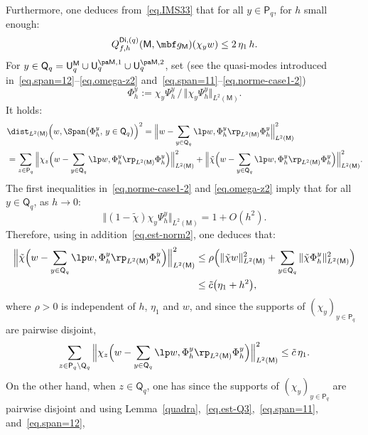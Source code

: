 Furthermore, one deduces from~\eqref{eq.IMS33} that for all $y\in \mathsf P_q$, for $h$ small enough:
\begin{equation}\label{eq.est-Q3}
Q_{f,h}^{\mathsf{Di},(q)}(\mathsf M,\mbf g_{\mathsf M})(\chi_y w) \le 2\, \eta_1\, h.
\end{equation}
For $y\in \mathsf Q_q= \mathsf U_q^{\mathsf M}\cup \mathsf U^{\pa
\mathsf M,1}_q\cup \mathsf U^{\pa \mathsf M,2}_q$, set (see the
quasi-modes introduced in~\eqref{eq.span=12}--\eqref{eq.omega-z2} and~\eqref{eq.span=11}--\eqref{eq.norme-case1-2})
\begin{equation}\label{eq.PHIY}
\Phi_h^y:= \chi_y\Psi_h^y\, /\, \Vert \chi_y \Psi_h^y \Vert_{L^2(\mathsf M)}.
\end{equation}
It holds:
\begin{align*}
&\dist_{L^2(\mathsf M)}\Bigl(w, \Span \bigl(\Phi_h^y, \, y\in \mathsf Q_q \bigr) \Bigr)^2= \Big \Vert w- \sum_{y \in \mathsf Q_q} \lp w, \Phi_h^y\rp _{L^2(\mathsf M)} \Phi_h^y \Big \Vert_{L^2(\mathsf M)}^2\\
&= \sum_{z\in \mathsf P_q}\Big \Vert \chi_z\Bigl(w- \sum_{y
\in \mathsf Q_q} \lp w, \Phi_h^y\rp _{L^2(\mathsf M)} \Phi_h^y\Bigr) \Big \Vert_{L^2(\mathsf M)}^2 +\Big\Vert \tilde \chi\Bigl(w- \sum_{y \in \mathsf Q_q} \lp w, \Phi_h^y\rp _{L^2(\mathsf M)} \Phi_h^y\Bigr) \Big\Vert_{L^2(\mathsf M)}^2.
\end{align*}
The first inequalities in~\eqref{eq.norme-case1-2} and \eqref{eq.omega-z2} imply that for all $y\in \mathsf Q_q$, as $h\to 0$:
\[
\Vert (1-\tilde \chi)\chi_y \Psi_h^y \Vert_{L^2(\mathsf M)} =1+O (h^{2}).
\]
Therefore, using in addition~\eqref{eq.est-norm2}, one deduces that:
\[
\begin{aligned}\Big\Vert \tilde \chi\Bigl(w- \sum_{y \in
\mathsf Q_q} \lp w, \Phi_h^y\rp _{L^2(\mathsf M)}
\Phi_h^y\Bigr) \Big\Vert_{L^2(\mathsf M)}^2 &\le \rho \Bigl(\Vert\tilde \chi w \Vert_{L^2(\mathsf M)}^2 + \sum_{y \in
\mathsf Q_q} \Vert\tilde \chi \Phi_h^y \Vert_{L^2(\mathsf
M)}^2 \Bigr)\\
&\le \tilde c \bigl(\eta_1 +h^2\bigr),
\end{aligned}
\]
where $\rho>0$ is independent of $h$, $\eta_1$ and $w$,
and since the supports of $(\chi_y)_{y\in \mathsf P_q}$ are pairwise disjoint,
\[
\sum_{z\in \mathsf P_q\setminus \mathsf Q_q}\Big \Vert \chi_z\Bigl(w- \sum_{y \in \mathsf Q_q} \lp w, \Phi_h^y\rp _{L^2(\mathsf M)} \Phi_h^y\Bigr) \Big \Vert_{L^2(\mathsf M)}^2 \le \tilde c\, \eta_1.
\]
On the other hand, when $z\in \mathsf Q_q$, one has since the supports of $(\chi_y)_{y\in \mathsf P_q}$ are pairwise disjoint and using Lemma~\ref{quadra},~\eqref{eq.est-Q3},~\eqref{eq.span=11}, and~\eqref{eq.span=12},

